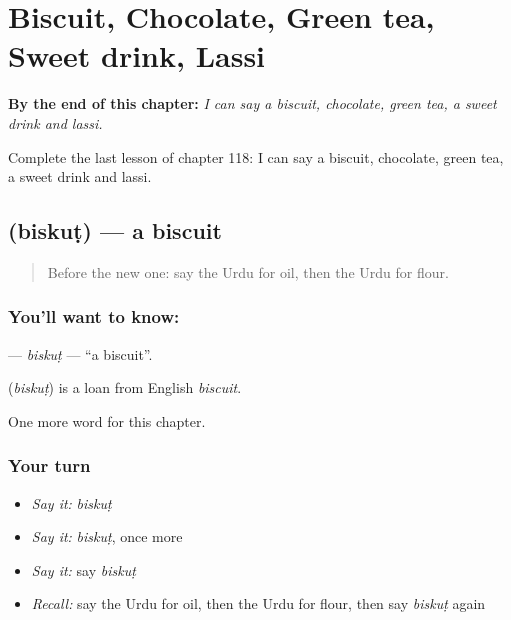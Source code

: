 
\chapter{Biscuit, Chocolate, Green tea, Sweet drink, Lassi}
\label{ch:ur-biscuit-chocolate-green-tea-sweet-drink-lassi}

\begin{chapteropening}
\textbf{By the end of this chapter:} \emph{I can say a biscuit, chocolate, green tea, a sweet drink and lassi.}

Complete the last lesson of chapter 118: I can say a biscuit, chocolate, green tea, a sweet drink and lassi.
\end{chapteropening}

\section[\texorpdfstring{\ur{بسکٹ} (biskuṭ)}{بسکٹ (biskuṭ)}]{ (biskuṭ) — a biscuit}

\label{lesson:UR-C118-biskut}



\begin{quote}
Before the new one: say the Urdu for oil, then the Urdu for flour.
\end{quote}

\subsection*{You'll want to know: }
\textbf{} — \emph{biskuṭ} — \textquotedblleft{}a biscuit\textquotedblright{}.

\begin{cousinweb}
\textbf{} (\emph{biskuṭ}) is a loan from English \emph{biscuit}.
\end{cousinweb}

\begin{grammarlens}[title={What you've built}]
One more word for this chapter.
\end{grammarlens}

\subsection*{Your turn}
\begin{itemize}
\raggedright
  \item \emph{Say it:} \emph{biskuṭ}
  \item \emph{Say it:} \emph{biskuṭ}, once more
  \item \emph{Say it:} say \emph{biskuṭ}
  \item \emph{Recall:} say the Urdu for oil, then the Urdu for flour, then say \emph{biskuṭ} again
\end{itemize}

